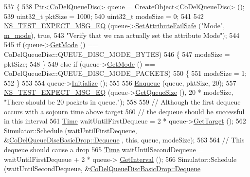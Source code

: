 \begin{DoxyCode}
537 \{
538   \hyperlink{classns3_1_1Ptr}{Ptr<CoDelQueueDisc>} queue = CreateObject<CoDelQueueDisc> ();
539   uint32\_t pktSize = 1000;
540   uint32\_t modeSize = 0;
541 
542   \hyperlink{group__testing_ga7304ba46a28d8cf08dfdfd6499cf7068}{NS\_TEST\_EXPECT\_MSG\_EQ} (queue->\hyperlink{classns3_1_1ObjectBase_aa7d333004e970f925a4ed5df275541b5}{SetAttributeFailSafe} (\textcolor{stringliteral}{"Mode"}, 
      \hyperlink{classCoDelQueueDiscBasicDrop_a1208afca60fdedfcb0be0a73a5905aa7}{m\_mode}), \textcolor{keyword}{true},
543                          \textcolor{stringliteral}{"Verify that we can actually set the attribute Mode"});
544   
545   \textcolor{keywordflow}{if} (queue->\hyperlink{classns3_1_1CoDelQueueDisc_ab4e1b3733d0961c823b6fa7d2e36c0bb}{GetMode} () == CoDelQueueDisc::QUEUE\_DISC\_MODE\_BYTES)
546     \{
547       modeSize = pktSize;
548     \}
549   \textcolor{keywordflow}{else} \textcolor{keywordflow}{if} (queue->\hyperlink{classns3_1_1CoDelQueueDisc_ab4e1b3733d0961c823b6fa7d2e36c0bb}{GetMode} () == CoDelQueueDisc::QUEUE\_DISC\_MODE\_PACKETS)
550     \{
551       modeSize = 1;
552     \}
553 
554   queue->\hyperlink{classns3_1_1Object_af4411cb29971772fcd09203474a95078}{Initialize} ();
555 
556   \hyperlink{classCoDelQueueDiscBasicDrop_ab9cfc5b9eee0eaf28cb7f84a7681d08e}{Enqueue} (queue, pktSize, 20);
557   \hyperlink{group__testing_ga7304ba46a28d8cf08dfdfd6499cf7068}{NS\_TEST\_EXPECT\_MSG\_EQ} (queue->\hyperlink{classns3_1_1CoDelQueueDisc_a2eed623615f381b9c377ed7add064953}{GetQueueSize} (), 20 * modeSize, \textcolor{stringliteral}{"There
       should be 20 packets in queue."});
558 
559   \textcolor{comment}{// Although the first dequeue occurs with a sojourn time above target}
560   \textcolor{comment}{// the dequeue should be successful in this interval}
561   \hyperlink{classns3_1_1Time}{Time} waitUntilFirstDequeue =  2 * queue->\hyperlink{classns3_1_1CoDelQueueDisc_aacbaf8a85b6a82b9175db11bac44e55f}{GetTarget} ();
562   Simulator::Schedule (waitUntilFirstDequeue, &\hyperlink{classCoDelQueueDiscBasicDrop_ab858662db8af1c6f181bd0d01d44ce48}{CoDelQueueDiscBasicDrop::Dequeue}
      , \textcolor{keyword}{this}, queue, modeSize);
563 
564   \textcolor{comment}{// This dequeue should cause a drop}
565   \hyperlink{classns3_1_1Time}{Time} waitUntilSecondDequeue = waitUntilFirstDequeue + 2 * queue->
      \hyperlink{classns3_1_1CoDelQueueDisc_a8527687c2e67d2b90adb63fb5b9ce204}{GetInterval} ();
566   Simulator::Schedule (waitUntilSecondDequeue, &\hyperlink{classCoDelQueueDiscBasicDrop_ab858662db8af1c6f181bd0d01d44ce48}{CoDelQueueDiscBasicDrop::Dequeue}

\end{DoxyCode}
